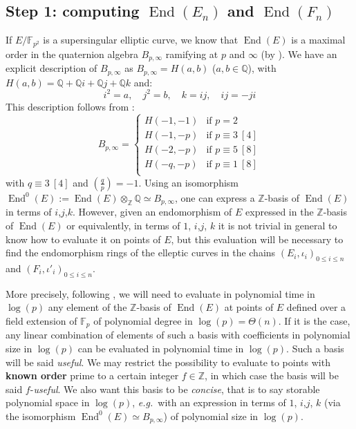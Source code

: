 \documentclass[a4paper,10pt]{report}
\theoremstyle{definition}
\theoremstyle{plain}
\theoremstyle{definition}
\newcommand{\eg}{\emph{e.g.}\ }
\newcommand{\Z}{\mathbb{Z}}
\newcommand{\Q}{\mathbb{Q}}
\newcommand{\F}{\mathbb{F}}
\renewcommand{\(}{\left(}
\renewcommand{\)}{\right)}
\DeclareMathOperator{\End}{End}
\begin{document}
\subsection{Step 1: computing $\End(E_n)$ and $\End(F_n)$}\label{paragraph 6}

If $E/\F_{p^2}$ is a supersingular elliptic curve, we know that $\End(E)$ is a maximal order in the quaternion algebra $B_{p,\infty}$ ramifying at $p$ and $\infty$ (by \cite[theorem 42.1.9]{Voight}).  We have an explicit description of $B_{p,\infty}$ as $B_{p,\infty}=H(a,b)$ ($a,b\in\Q$), with $H(a,b)=\Q+\Q i+\Q j+\Q k$ and:
\[i^2=a, \quad j^2=b, \quad k=ij,\quad ij=-ji\]
This description follows from \cite[proposition 5.1]{Pizer80}:
\[B_{p,\infty}=\left\{\begin{array}{cl}
H(-1,-1) & \mbox{if } p=2\\
H(-1,-p) & \mbox{if } p\equiv 3 \ [4]\\
H(-2,-p)  & \mbox{if } p\equiv 5 \ [8]\\
H(-q,-p)  & \mbox{if } p\equiv 1 \ [8]\\
\end{array}\right.\]
with $q\equiv 3 \ [4]$ and $\(\frac{q}{p}\)=-1$. Using an isomorphism $\End^0(E):=\End(E)\otimes_\Z\Q\simeq B_{p,\infty}$, one can express a $\Z$-basis of $\End(E)$ in terms of $i$,$j$,$k$. However, given an endomorphism of $E$ expressed in the $\Z$-basis of $\End(E)$ or equivalently, in terms of $1$, $i$,$j$, $k$ it is not trivial in general to know how to evaluate it on points of $E$, but this evaluation will be necessary to find the endomorphism rings of the elleptic curves in the chains  $(E_i,\iota_i)_{0\leq i\leq n}$ and $(F_i,\iota'_i)_{0\leq i\leq n}$. 

More precisely, following \cite{LP_merged}, we will need to evaluate in polynomial time in $\log(p)$ any element of the $\Z$-basis of $\End(E)$ at points of $E$ defined over a field extension of $\F_p$ of polynomial degree in $\log(p)=\Theta(n)$. If it is the case,  any linear combination of elements of such a basis with coefficients in polynomial size in $\log(p)$ can be evaluated in polynomial time in $\log(p)$.  Such a basis will be said \emph{useful}.  We may restrict the possibility to evaluate to points with \textbf{known order} prime to a certain integer $f\in\Z$,  in which case the basis will be said $f$-\emph{useful}. We also want this basis to be \emph{concise}, that is to say storable polynomial space in $\log(p)$, \eg with an expression in terms of $1$, $i$,$j$, $k$ (via the isomorphism $\End^0(E)\simeq B_{p,\infty}$) of polynomial size in $\log(p)$. 
\end{document}

